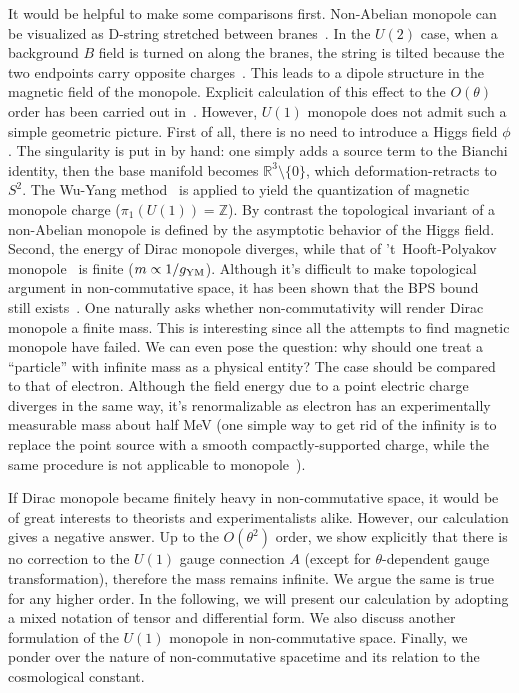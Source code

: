 \documentclass[a4paper,12pt]{article}
\begin{document}
It would be helpful to make some comparisons f\mbox{}irst. 
Non-Abelian monopole 
can be visualized as D-string stretched between 
branes~\cite{dl,dd}. In the $U(2)$ case, when a background $B$ f\mbox{}ield 
is turned on along the branes, the string is tilted because the two
endpoints carry opposite charges~\cite{hh}. This leads to a dipole structure
in the magnetic f\mbox{}ield of the monopole. Explicit calculation of
this ef\mbox{}fect to the $O(\theta)$ order has been carried out 
in~\cite{hhm,db}.
However, $U(1)$ monopole does not admit such a simple geometric picture.
First of all, there is no need to introduce a Higgs f\mbox{}ield $\phi$. The
singularity is put in by hand: one simply adds a source term to the Bianchi
identity, then the base manifold becomes $\mathbb{R}^3\setminus \{0\}$, which
deformation-retracts to $S^2$. The Wu-Yang method~\cite{wy} is applied
to yield the quantization of magnetic monopole charge 
($\pi _1(U(1))=\mathbb{Z}$). By contrast the topological invariant of a
non-Abelian monopole is def\mbox{}ined by the asymptotic behavior of the Higgs
f\mbox{}ield. Second, the energy of Dirac monopole diverges, while that of 
't~Hooft-Polyakov monopole~\cite{gh,ap} is f\mbox{}inite ($m\propto 
1/g_{\rm YM}$). 
Although it's dif\mbox{}f\mbox{}icult 
to make topological argument in non-commutative space, it has been shown
that the BPS bound~\cite{eb,ps} still exists~\cite{hh,hhm,db}. One naturally 
asks whether non-commutativity will render Dirac monopole a f\mbox{}inite mass.
This is interesting since all the attempts to f\mbox{}ind magnetic 
monopole have
failed. We can even pose the question: why should one treat a ``particle''
with inf\mbox{}inite mass as a physical entity? The case should be compared
to that of electron. Although the f\mbox{}ield energy due to a point 
electric charge diverges in the same way, it's renormalizable as electron
has an experimentally measurable mass about half MeV (one simple way to
get rid of the inf\mbox{}inity is to replace the point source with a smooth
compactly-supported charge, while the same procedure is not applicable
to monopole~\cite{jt}). 

If Dirac monopole became f\mbox{}initely heavy in
non-commutative space, it would be of great interests to theorists and
experimentalists alike. However, our calculation gives a negative answer. 
Up to the $O(\theta ^2)$ order,
we show explicitly that there is no correction to the $U(1)$ gauge 
connection $A$ (except for $\theta$-dependent gauge transformation), 
therefore the mass remains inf\mbox{}inite. We
argue the same is true for any higher order. In the following, we will present
our calculation by adopting a mixed notation of tensor and dif\mbox{}ferential
form. We also discuss another formulation of the $U(1)$ monopole in
non-commutative space. Finally, we ponder over the nature of non-commutative
spacetime and its relation to the cosmological constant.
\end{document}
